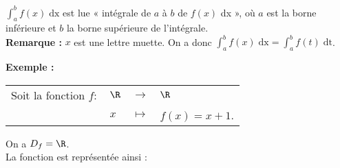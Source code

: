 \vspace*{.3cm}

$\displaystyle \int_a^b f(x) \; \mathrm{dx}$ est lue « intégrale de $a$ à $b$ de $f(x)$ dx », où $a$ est la borne inférieure et $b$ la borne supérieure de l'intégrale. \\

\textbf{Remarque :} $x$ est une lettre muette. On a donc $\displaystyle \int_a^b f(x) \; \mathrm{dx} = \displaystyle \int_a^b f(t) \; \mathrm{dt}$. \\

\newpage

\textbf{Exemple :} \\

\begin{tabular}{llll}
Soit la fonction $f:$ & $\R$ & $\longrightarrow$ & $\R$ \\
& $x$ & $\longmapsto$ & $f(x) = x+1$. \\
\end{tabular}

\vspace*{.3cm}

On a $D_f = \R$. \\

La fonction est représentée ainsi : \\

